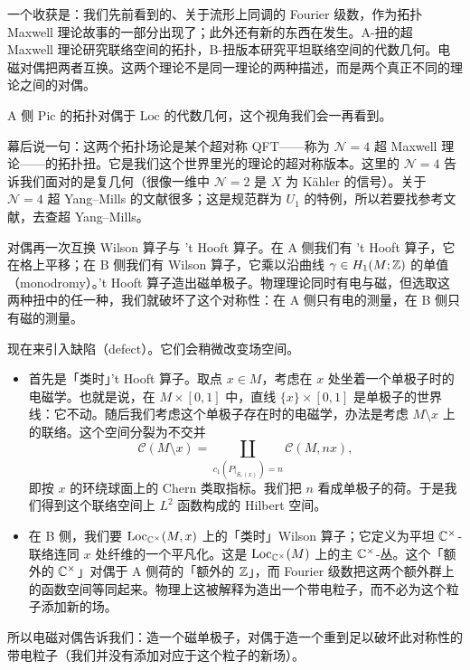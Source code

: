 一个收获是：我们先前看到的、关于流形上同调的 Fourier 级数，作为拓扑 Maxwell 理论故事的一部分出现了；此外还有新的东西在发生。A-扭的超 Maxwell 理论研究联络空间的拓扑，B-扭版本研究平坦联络空间的代数几何。电磁对偶把两者互换。这两个理论不是同一理论的两种描述，而是两个真正不同的理论之间的对偶。

A 侧 $\mathrm{Pic}$ 的拓扑对偶于 $\mathrm{Loc}$ 的代数几何，这个视角我们会一再看到。

幕后说一句：这两个拓扑场论是某个超对称 QFT——称为 $\mathcal{N} = 4$ 超 Maxwell 理论——的拓扑扭。它是我们这个世界里光的理论的超对称版本。这里的 $\mathcal{N} = 4$ 告诉我们面对的是复几何（很像一维中 $\mathcal{N} = 2$ 是 $X$ 为 Kähler 的信号）。关于 $\mathcal{N} = 4$ 超 Yang--Mills 的文献很多；这是规范群为 $U_1$ 的特例，所以若要找参考文献，去查超 Yang--Mills。

对偶再一次互换 Wilson 算子与 't Hooft 算子。在 A 侧我们有 't Hooft 算子，它在格上平移；在 B 侧我们有 Wilson 算子，它乘以沿曲线 $\gamma\in H_1(M;\mathbb{Z})$ 的单值（monodromy）。't Hooft 算子造出磁单极子。物理理论同时有电与磁，但选取这两种扭中的任一种，我们就破坏了这个对称性：在 A 侧只有电的测量，在 B 侧只有磁的测量。

现在来引入缺陷（defect）。它们会稍微改变场空间。

\begin{itemize}
  \item 首先是「类时」't Hooft 算子。取点 $x\in M$，考虑在 $x$ 处坐着一个单极子时的电磁学。也就是说，在 $M\times[0,1]$ 中，直线 $\{x\}\times[0,1]$ 是单极子的世界线：它不动。随后我们考虑这个单极子存在时的电磁学，办法是考虑 $M\setminus x$ 上的联络。这个空间分裂为不交并
  \[
    \mathcal{C}(M\setminus x) = \coprod_{c_1(P|_{S_\varepsilon(x)}) = n}\mathcal{C}(M,nx),
  \]
  即按 $x$ 的环绕球面上的 Chern 类取指标。我们把 $n$ 看成单极子的荷。于是我们得到这个联络空间上 $L^2$ 函数构成的 Hilbert 空间。

  \item 在 B 侧，我们要 $\mathrm{Loc}_{\mathbb{C}^\times}(M,x)$ 上的「类时」Wilson 算子；它定义为平坦 $\mathbb{C}^\times$-联络连同 $x$ 处纤维的一个平凡化。这是 $\mathrm{Loc}_{\mathbb{C}^\times}(M)$ 上的主 $\mathbb{C}^\times$-丛。这个「额外的 $\mathbb{C}^\times$」对偶于 A 侧荷的「额外的 $\mathbb{Z}$」，而 Fourier 级数把这两个额外群上的函数空间等同起来。物理上这被解释为造出一个带电粒子，而不必为这个粒子添加新的场。
\end{itemize}

所以电磁对偶告诉我们：造一个磁单极子，对偶于造一个重到足以破坏此对称性的带电粒子（我们并没有添加对应于这个粒子的新场）。


